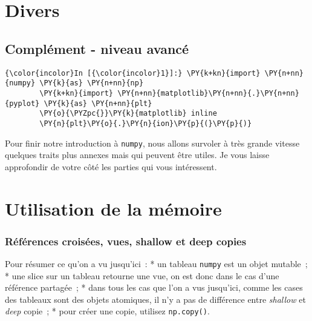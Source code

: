     
    
    
    

    

    \hypertarget{divers}{%
\section{Divers}\label{divers}}

    \hypertarget{compluxe9ment---niveau-avancuxe9}{%
\subsection{Complément - niveau
avancé}\label{compluxe9ment---niveau-avancuxe9}}

    \begin{Verbatim}[commandchars=\\\{\}]
{\color{incolor}In [{\color{incolor}1}]:} \PY{k+kn}{import} \PY{n+nn}{numpy} \PY{k}{as} \PY{n+nn}{np}
        \PY{k+kn}{import} \PY{n+nn}{matplotlib}\PY{n+nn}{.}\PY{n+nn}{pyplot} \PY{k}{as} \PY{n+nn}{plt}
        \PY{o}{\PYZpc{}}\PY{k}{matplotlib} inline
        \PY{n}{plt}\PY{o}{.}\PY{n}{ion}\PY{p}{(}\PY{p}{)}
\end{Verbatim}


    Pour finir notre introduction à \texttt{numpy}, nous allons survoler à
très grande vitesse quelques traits plus annexes mais qui peuvent être
utiles. Je vous laisse approfondir de votre côté les parties qui vous
intéressent.

    \hypertarget{utilisation-de-la-muxe9moire}{%
\section{Utilisation de la mémoire}\label{utilisation-de-la-muxe9moire}}

    \hypertarget{ruxe9fuxe9rences-croisuxe9es-vues-shallow-et-deep-copies}{%
\subsubsection{Références croisées, vues, shallow et deep
copies}\label{ruxe9fuxe9rences-croisuxe9es-vues-shallow-et-deep-copies}}

    Pour résumer ce qu'on a vu jusqu'ici~: * un tableau \texttt{numpy} est
un objet mutable~; * une slice sur un tableau retourne une vue, on est
donc dans le cas d'une référence partagée~; * dans tous les cas que l'on
a vus jusqu'ici, comme les cases des tableaux sont des objets atomiques,
il n'y a pas de différence entre \emph{shallow} et \emph{deep} copie~; *
pour créer une copie, utilisez \texttt{np.copy()}.

